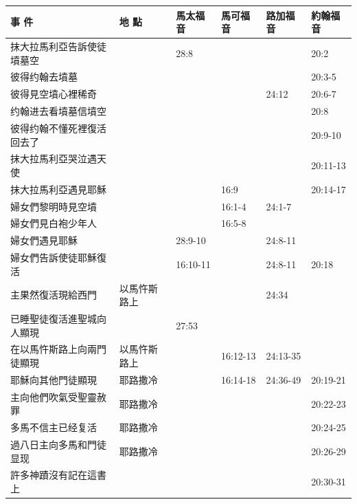 \begin{table}[H]
  \centering
    \begin{tabular}{p{14em}|p{7.93em}|l|l|l|p{4.855em}}
    \toprule
    \textbf{事 件} & \textbf{地 點} & \multicolumn{1}{p{5.285em}|}{\textbf{馬太福音}} & \multicolumn{1}{p{5.57em}|}{\textbf{馬可福音}} & \multicolumn{1}{p{5.285em}|}{\textbf{路加福音}} & \textbf{約翰福音} \\  \midrule
抹大拉馬利亞告訴使徒墳墓空&       &28:8&       &&20:2 \\\midrule

彼得约翰去墳墓&       &&       &&20:3-5 \\\midrule


彼得見空墳心裡稀奇&       &       &       &24:12&20:6-7\\\midrule
约翰进去看墳墓信墳空&       &&       &&20:8\\\midrule
彼得约翰不懂死裡復活回去了&       &&       &&20:9-10\\\midrule

抹大拉馬利亞哭泣遇天使&       &&       &&20:11-13\\\midrule
抹大拉馬利亞遇見耶穌&       && 16:9&&20:14-17\\\midrule

婦女們黎明時見空墳&       &       &16:1-4&24:1-7&  \\\midrule
婦女們見白袍少年人&       &       &16:5-8&&  \\\midrule
婦女們遇見耶穌&       &28:9-10&       &24:8-11&  \\\midrule
婦女們告訴使徒耶穌復活&       &16:10-11&       &24:8-11&20:18 \\\midrule

主果然復活現給西門&以馬忤斯路上&       &       &24:34&  \\\midrule
已睡聖徒復活進聖城向人顯現&& 27:53&       &&  \\\midrule

在以馬忤斯路上向兩門徒顯現&以馬忤斯路上&       &16:12-13 &24:13-35&  \\\midrule
耶穌向其他門徒顯現&耶路撒冷 &       &16:14-18&24:36-49&20:19-21\\\midrule

主向他們吹氣受聖靈赦罪&耶路撒冷 &       &&&20:22-23 \\\midrule
多馬不信主已经复活&耶路撒冷 &       &&&20:24-25\\\midrule

過八日主向多馬和門徒显现&耶路撒冷 &       &&&20:26-29\\\midrule
許多神蹟沒有記在這書上& &       &&&20:30-31\\\midrule


\end{tabular}
\end{table}
